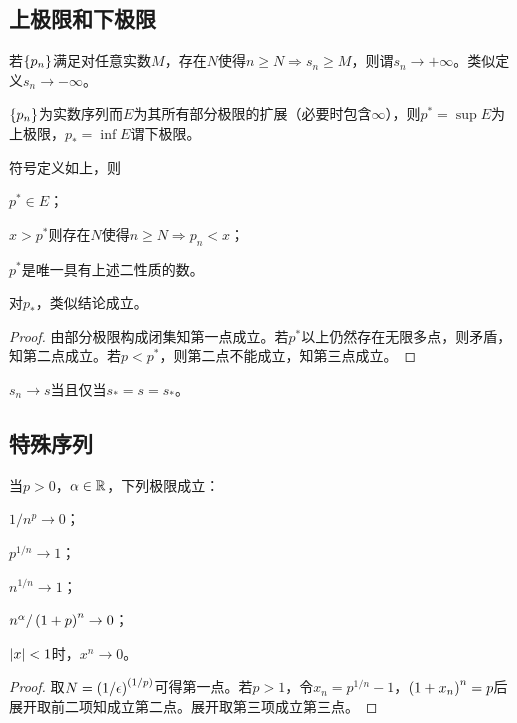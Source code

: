 \documentclass{ctexrep}
\begin{document}
  \subsection{上极限和下极限}
  \begin{definition}
    若$\left\{p_n\right\}$满足对任意实数$M$，存在$N$使得$n\ge N\Rightarrow s_n\ge M$，则谓$s_n\rightarrow +\infty$。类似定义$s_n\rightarrow -\infty$。
  \end{definition}
  \begin{definition}
    $\left\{p_n\right\}$为实数序列而$E$为其所有部分极限的扩展（必要时包含$\infty$），则$p^*=\sup E$为上极限，$p_*=\inf E$谓下极限。
  \end{definition}
  \begin{theorem}
    \label{thm:sup}
    符号定义如上，则
    \begin{cenum}
      \item $p^*\in E$；
      \item $x>p^*$则存在$N$使得$n\ge N\Rightarrow p_n<x$；
      \item $p^*$是唯一具有上述二性质的数。
    \end{cenum}
    对$p_*$，类似结论成立。
  \end{theorem}
  \begin{proof}
    由部分极限构成闭集知第一点成立。若$p^*$以上仍然存在无限多点，则矛盾，知第二点成立。若$p<p^*$，则第二点不能成立，知第三点成立。
  \end{proof}
  \begin{theorem}
    $s_n\rightarrow s$当且仅当$s_*=s=s_*$。
  \end{theorem}
  \subsection{特殊序列}
  \begin{theorem}
    当$p>0$，$\alpha\in\mathbb{R}$，下列极限成立：
    \begin{cenum}
      \item $1/n^p\rightarrow 0$；
      \item $p^{{1/n}}\rightarrow 1$；
      \item $n^{1/n}\rightarrow 1$；
      \item $n^\alpha/\left(1+p\right)^n\rightarrow 0$；
      \item $\abs{x}<1$时，$x^n\rightarrow 0$。
    \end{cenum}
  \end{theorem}
  \begin{proof}
    取$N=\left(1/\epsilon\right)^{\left(1/p\right)}$可得第一点。若$p>1$，令$x_n=p^{1/n}-1$，$\left(1+x_n\right)^n=p$后展开取前二项知成立第二点。展开取第三项成立第三点。
  \end{proof}
\end{document}
